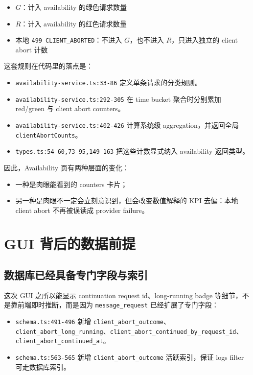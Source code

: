 \documentclass[a4paper]{article}
\newcommand{\filepath}[1]{\nolinkurl{#1}}
\begin{document}
\begin{itemize}
\item $G$：计入 availability 的绿色请求数量
\item $R$：计入 availability 的红色请求数量
\item 本地 \texttt{499 CLIENT\_ABORTED}：不进入 $G$，也不进入 $R$，只进入独立的 client abort 计数
\end{itemize}

这套规则在代码里的落点是：

\begin{itemize}
\item \filepath{availability-service.ts:33-86} 定义单条请求的分类规则。
\item \filepath{availability-service.ts:292-305} 在 time bucket 聚合时分别累加 red/green 与 client abort counters。
\item \filepath{availability-service.ts:402-426} 计算系统级 aggregation，并返回全局 \filepath{clientAbortCounts}。
\item \filepath{types.ts:54-60,73-95,149-163} 把这些计数显式纳入 availability 返回类型。
\end{itemize}

因此，Availability 页有两种层面的变化：

\begin{itemize}
\item 一种是肉眼能看到的 counters 卡片；
\item 另一种是肉眼不一定会立刻意识到，但会改变数值解释的 KPI 去偏：本地 client abort 不再被误读成 provider failure。
\end{itemize}

\section{GUI 背后的数据前提}

\subsection{数据库已经具备专门字段与索引}

这次 GUI 之所以能显示 continuation request id、long-running badge 等细节，不是靠前端即时推断，而是因为 \filepath{message\_request} 已经扩展了专门字段：

\begin{itemize}
\item \filepath{schema.ts:491-496} 新增 \filepath{client_abort_outcome}、\filepath{client_abort_long_running}、\filepath{client_abort_continued_by_request_id}、\filepath{client_abort_continued_at}。
\item \filepath{schema.ts:563-565} 新增 \filepath{client_abort_outcome} 活跃索引，保证 logs filter 可走数据库索引。
\end{itemize}
\end{document}
